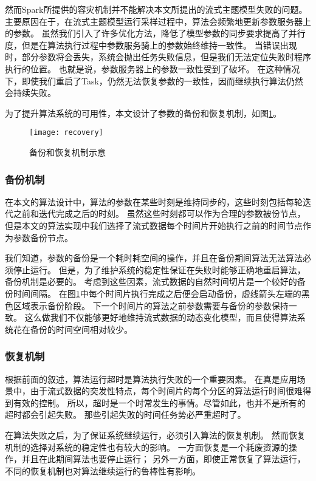 然而Spark所提供的容灾机制并不能解决本文所提出的流式主题模型失败的问题。
主要原因在于，在流式主题模型运行采样过程中，算法会频繁地更新参数服务器上的参数。
虽然我们引入了许多优化方法，降低了模型参数的同步要求提高了并行度，但是在算法执行过程中参数服务骑上的参数始终维持一致性。
当错误出现时，部分参数将会丢失，系统会抛出任务失败信息，但是我们无法定位失败时程序执行的位置。
也就是说，参数服务器上的参数一致性受到了破坏。
在这种情况下，即使我们重启了Task，仍然无法恢复参数的一致性，因而继续执行算法仍然会持续失败。

为了提升算法系统的可用性，本文设计了参数的备份和恢复机制，如图\ref{fig:recovery}。
\begin{figure}[htb]\centering
\texttt{[image: recovery]}
\caption{备份和恢复机制示意}
\label{fig:recovery}%
\end{figure}

\subsubsection{备份机制}
在本文的算法设计中，算法的参数在某些时刻是维持同步的，这些时刻包括每轮迭代之前和迭代完成之后的时刻。
虽然这些时刻都可以作为合理的参数被份节点，但是本文的算法实现中我们选择了流式数据每个时间片开始执行之前的时间节点作为参数备份节点。

我们知道，参数的备份是一个耗时耗空间的操作，并且在备份期间算法无法算法必须停止运行。
但是，为了维护系统的稳定性保证在失败时能够正确地重启算法，备份机制是必要的。
考虑到这些因素，流式数据的自然时间切片是一个较好的备份时间间隔。
在图\ref{fig:recovery}中每个时间片执行完成之后便会启动备份，虚线箭头左端的黑色区域表示备份阶段。
下一个时间片的算法之前参数需要与备份的参数保持一致。
这么做我们不仅能够更好地维持流式数据的动态变化模型，而且使得算法系统花在备份的时间空间相对较少。

\subsubsection{恢复机制}
根据前面的叙述，算法运行超时是算法执行失败的一个重要因素。
在真是应用场景中，由于流式数据的突发性特点，每个时间片的每个分区的算法运行时间很难得到有效的控制。
所以，超时是一个时常发生的事情。尽管如此，也并不是所有的超时都会引起失败。
那些引起失败的时间任务势必严重超时了。

在算法失败之后，为了保证系统继续运行，必须引入算法的恢复机制。
然而恢复机制的选择对系统的稳定性也有较大的影响。
一方面恢复是一个耗废资源的操作，并且在此期间算法也要停止运行；
另外一方面，即使正常恢复了算法运行，不同的恢复机制也对算法继续运行的鲁棒性有影响。

